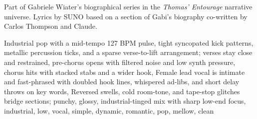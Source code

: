 
\begin{notes}
Part of Gabriele Wiater's biographical series in the \emph{Thomas’ Entourage} narrative universe. Lyrics by SUNO based on a section of Gabi's biography co-written by Carlos Thompson and Claude.
\end{notes}
\begin{style}
Industrial pop with a mid-tempo 127 BPM pulse, tight syncopated kick patterns, metallic percussion ticks, and a sparse verse-to-lift arrangement; verses stay close and restrained, pre-chorus opens with filtered noise and low synth pressure, chorus hits with stacked stabs and a wider hook, Female lead vocal is intimate and fast-phrased with doubled hook lines, whispered ad-libs, and short delay throws on key words, Reversed swells, cold room-tone, and tape-stop glitches bridge sections; punchy, glossy, industrial-tinged mix with sharp low-end focus, industrial, low, vocal, simple, dynamic, romantic, pop, mellow, clean
\end{style}
